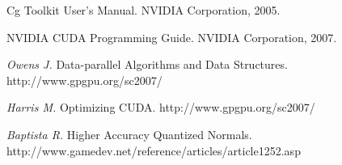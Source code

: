 \begin{thebibliography}{99}
    Cg Toolkit User's Manual.
    NVIDIA Corporation, 2005.

    NVIDIA CUDA Programming Guide.
    NVIDIA Corporation, 2007.

    \emph{Owens J.}  Data-parallel Algorithms and Data Structures.
    http://www.gpgpu.org/sc2007/

    \emph{Harris M.}  Optimizing CUDA.
    http://www.gpgpu.org/sc2007/

    \emph{Baptista R.}  Higher Accuracy Quantized Normals.
    http://www.gamedev.net/reference/articles/article1252.asp

\end{thebibliography}